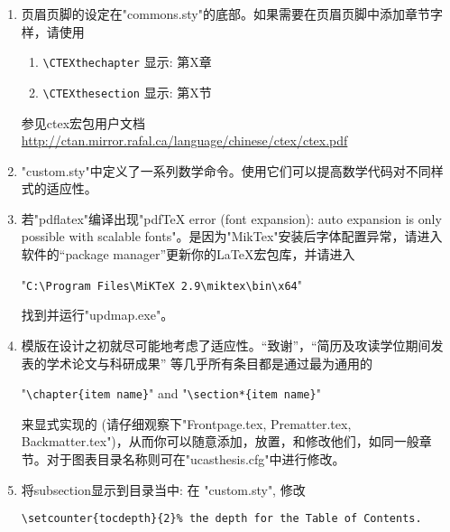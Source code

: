 \begin{enumerate}
      在"Thesis.tex"中设置启用adobe的字体:

      \verb+\documentclass[doublesided,fontset=adobe]{Style/ucasthesis}%+

      如果\LaTeX{}软件版本比较老旧，如Linux用户，ctex宏包没有更新，设置启用adobe的字体则为:

      \verb+\documentclass[doublesided,adobefonts]{Style/ucasthesis}%+
     
     最后推荐选择"xelatex"编译引擎编译。

     因为模版的设定考虑兼顾不同操作系统(Windows, Linux, Mac OS)并兼顾pdflatex和xelatex，为了模版的健壮性，上述方案并未作为原始设定。
  \item 页眉页脚的设定在"commons.sty"的底部。如果需要在页眉页脚中添加章节字样，请使用
      \begin{enumerate}
          \item \verb+\CTEXthechapter+  显示: 第X章
          \item \verb+\CTEXthesection+  显示: 第X节
      \end{enumerate}
      参见ctex宏包用户文档\url{http://ctan.mirror.rafal.ca/language/chinese/ctex/ctex.pdf}
  \item "custom.sty"中定义了一系列数学命令。使用它们可以提高数学代码对不同样式的适应性。
  \item 若"pdflatex"编译出现"pdfTeX error (font expansion): auto expansion is only possible with scalable fonts"。是因为"MikTex"安装后字体配置异常，请进入软件的“package manager”更新你的\LaTeX{}宏包库，并请进入
      
      "\verb+C:\Program Files\MiKTeX 2.9\miktex\bin\x64+"

       找到并运行"updmap.exe"。
   \item 模版在设计之初就尽可能地考虑了适应性。“致谢”，“简历及攻读学位期间发表的学术论文与科研成果”
       等几乎所有条目都是通过最为通用的
       
       "\verb+\chapter{item name}+"  and "\verb+\section*{item name}+"

       来显式实现的 (请仔细观察下"Frontpage.tex, Prematter.tex, Backmatter.tex")，从而你可以随意添加，放置，和修改他们，如同一般章节。对于图表目录名称则可在"ucasthesis.cfg"中进行修改。
    \item 将subsection显示到目录当中: 在 "custom.sty", 修改
        
        \verb|\setcounter{tocdepth}{2}% the depth for the Table of Contents.|
\end{enumerate}

